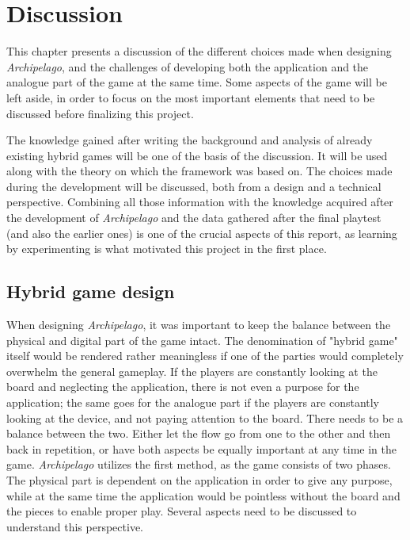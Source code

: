 \chapter{Discussion}
\label{sec:disc}
This chapter presents a discussion of the different choices made when designing \textit{Archipelago}, and the challenges of developing both the application and the analogue part of the game at the same time. Some aspects of the game will be left aside, in order to focus on the most important elements that need to be discussed before finalizing this project.

The knowledge gained after writing the background and analysis of already existing hybrid games will be one of the basis of the discussion. It will be used along with the theory on which the framework was based on. The choices made during the development will be discussed, both from a design and a technical perspective. Combining all those information with the knowledge acquired after the development of \textit{Archipelago} and the data gathered after the final playtest (and also the earlier ones) is one of the crucial aspects of this report, as learning by experimenting is what motivated this project in the first place. 

\section{Hybrid game design}
When designing \textit{Archipelago}, it was important to keep the balance between the physical and digital part of the game intact. The denomination of "hybrid game" itself would be rendered rather meaningless if one of the parties would completely overwhelm the general gameplay. If the players are constantly looking at the board and neglecting the application, there is not even a purpose for the application; the same goes for the analogue part if the players are constantly looking at the device, and not paying attention to the board. There needs to be a balance between the two. Either let the flow go from one to the other and then back in repetition, or have both aspects be equally important at any time in the game. 
\textit{Archipelago} utilizes the first method, as the game consists of two phases. The physical part is dependent on the application in order to give any purpose, while at the same time the application would be pointless without the board and the pieces to enable proper play. Several aspects need to be discussed to understand this perspective.

